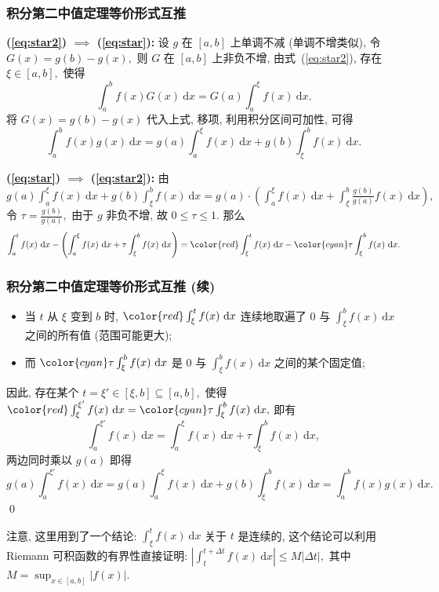 \begin{frame}
\frametitle{积分第二中值定理等价形式互推}

\textbf{(\ref{eq:star2}) $\implies$ (\ref{eq:star}):} 设 $g$ 在 $[a, b]$ 上单调不减 (单调不增类似), 令 $G(x) = g(b) - g(x),$ 则 $G$ 在 $[a, b]$ 上非负不增, 由式~(\ref{eq:star2}), 存在 $\xi \in [a, b],$ 使得
\[
\int_a^b f(x) G(x) ~ \mathrm{d} x = G(a) \int_a^\xi f(x) ~ \mathrm{d} x.
\]
将 $G(x) = g(b) - g(x)$ 代入上式, 移项, 利用积分区间可加性, 可得
\[\int_a^b f(x) g(x) ~ \mathrm{d} x = g(a) \int_a^\xi f(x) ~ \mathrm{d} x + g(b) \int_\xi^b f(x) ~ \mathrm{d} x.\]

\pause
\vspace{0.5em}

\textbf{(\ref{eq:star}) $\implies$ (\ref{eq:star2}):} 由 $g(a) \int_a^\xi f(x) ~ \mathrm{d} x + g(b) \int_\xi^b f(x) ~ \mathrm{d} x = g(a) \cdot \left( \int_a^\xi f(x) ~ \mathrm{d} x + \int_\xi^b \frac{g(b)}{g(a)} f(x) ~ \mathrm{d} x \right),$ 令 $\tau = \frac{g(b)}{g(a)},$ 由于 $g$ 非负不增, 故 $0 \leqslant \tau \leqslant 1.$ 那么
\[
\int_a^t f(x) ~ \mathrm{d} x - \left( \int_a^\xi f(x) ~ \mathrm{d} x + \tau \int_\xi^b f(x) ~ \mathrm{d} x \right) = {\color{red}\int_\xi^t f(x) ~ \mathrm{d} x} - {\color{cyan}\tau \int_\xi^b f(x) ~ \mathrm{d} x}.
\]

\end{frame}


\begin{frame}
\frametitle{积分第二中值定理等价形式互推 (续)}

\begin{itemize}
\item 当 $t$ 从 $\xi$ 变到 $b$ 时, $\color{red} \int_\xi^t f(x) ~ \mathrm{d} x$ 连续地取遍了 $0$ 与 $\int_\xi^b f(x) ~ \mathrm{d} x$ 之间的所有值 (范围可能更大);
\item 而 $\color{cyan} \tau \int_\xi^b f(x) ~ \mathrm{d} x$ 是 $0$ 与 $\int_\xi^b f(x) ~ \mathrm{d} x$ 之间的某个固定值;
\end{itemize}
因此, 存在某个 $t = \xi' \in [\xi, b] \subseteq [a, b],$ 使得 $\color{red} \int_\xi^{\xi'} f(x) ~ \mathrm{d} x = \color{cyan} \tau \int_\xi^b f(x) ~ \mathrm{d} x,$ 即有
\[
\int_a^{\xi'} f(x) ~ \mathrm{d} x = \int_a^\xi f(x) ~ \mathrm{d} x + \tau \int_\xi^b f(x) ~ \mathrm{d} x,
\]
两边同时乘以 $g(a)$ 即得
\[
g(a) \int_a^{\xi'} f(x) ~ \mathrm{d} x = g(a) \int_a^\xi f(x) ~ \mathrm{d} x + g(b) \int_\xi^b f(x) ~ \mathrm{d} x = \int_a^b f(x) g(x) ~ \mathrm{d} x.
\]
\qed

\pause
\vspace{0.5em}

\alert{注意}, 这里用到了一个结论: $\int_\xi^t f(x) ~ \mathrm{d} x$ 关于 $t$ 是连续的, 这个结论可以利用 Riemann 可积函数的有界性直接证明:
\pause
$\left\lvert \int_{t}^{t+\Delta t} f(x) ~ \mathrm{d} x \right\rvert \leqslant M |\Delta t|,$ 其中 $M = \sup_{x \in [a, b]} |f(x)|.$

\end{frame}

